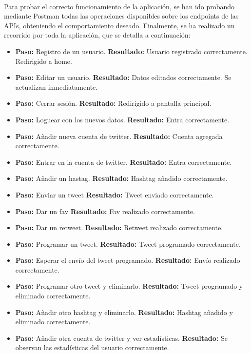 \documentclass[a4paper]{article}
\begin{document}
\paragraph{}Para probar el correcto funcionamiento de la aplicación, se han ido probando mediante Postman todas las operaciones disponibles sobre los endpoints de las APIs, obteniendo el comportamiento deseado. Finalmente, se ha realizado un recorrido por toda la aplicación, que se detalla a continuación:
\begin{itemize}
	\item \textbf{Paso: }Registro de un usuario. \textbf{Resultado:} Usuario registrado correctamente. Redirigido a home.
	\item \textbf{Paso: }Editar un usuario. \textbf{Resultado: }Datos editados correctamente. Se actualizan inmediatamente.
	\item \textbf{Paso: }Cerrar sesión. \textbf{Resultado: }Redirigido a pantalla principal.
	\item \textbf{Paso: }Loguear con los nuevos datos. \textbf{Resultado: }Entra correctamente.
	\item \textbf{Paso: }Añadir nueva cuenta de twitter. \textbf{Resultado: }Cuenta agregada correctamente.
	\item \textbf{Paso: }Entrar en la cuenta de twitter. \textbf{Resultado: }Entra correctamente.
	\item \textbf{Paso: }Añadir un hastag. \textbf{Resultado: }Hashtag añadido correctamente.
	\item \textbf{Paso: }Enviar un tweet \textbf{Resultado: }Tweet enviado correctamente.
	\item \textbf{Paso: }Dar un fav \textbf{Resultado: }Fav realizado correctamente.
    \item \textbf{Paso: }Dar un retweet. \textbf{Resultado: }Retweet realizado correctamente.
    \item \textbf{Paso: }Programar un tweet. \textbf{Resultado: }Tweet programado correctamente.
    \item \textbf{Paso: }Esperar el envío del tweet programado. \textbf{Resultado: }Envío realizado correctamente.
    \item \textbf{Paso: }Programar otro tweet y eliminarlo. \textbf{Resultado: }Tweet programado y eliminado correctamente.
    \item \textbf{Paso: }Añadir otro hashtag y eliminarlo. \textbf{Resultado: }Hashtag añadido y eliminado correctamente.
    \item \textbf{Paso: }Añadir otra cuenta de twitter y ver estadísticas. \textbf{Resultado: }Se observan las estadísticas del usuario correctamente.

\end{itemize}
\end{document}
